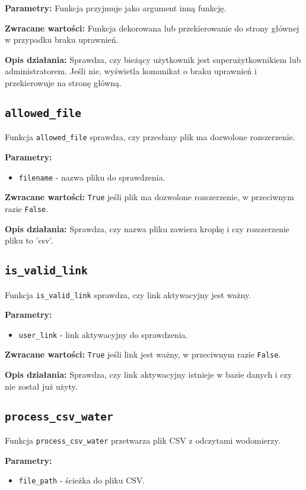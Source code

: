 \documentclass[12pt,a4paper]{report}
\begin{document}
\textbf{Parametry:} Funkcja przyjmuje jako argument inną funkcję.

\textbf{Zwracane wartości:} Funkcja dekorowana lub przekierowanie do strony głównej w przypadku braku uprawnień.

\textbf{Opis działania:}
Sprawdza, czy bieżący użytkownik jest superużytkownikiem lub administratorem. Jeśli nie, wyświetla komunikat o braku uprawnień i przekierowuje na stronę główną.

\subsection{\texttt{allowed\_file}}
Funkcja \texttt{allowed\_file} sprawdza, czy przesłany plik ma dozwolone rozszerzenie.

\textbf{Parametry:}
\begin{itemize}
    \item \texttt{filename} - nazwa pliku do sprawdzenia.
\end{itemize}

\textbf{Zwracane wartości:} \texttt{True} jeśli plik ma dozwolone rozszerzenie, w przeciwnym razie \texttt{False}.

\textbf{Opis działania:}
Sprawdza, czy nazwa pliku zawiera kropkę i czy rozszerzenie pliku to 'csv'.

\subsection{\texttt{is\_valid\_link}}
Funkcja \texttt{is\_valid\_link} sprawdza, czy link aktywacyjny jest ważny.

\textbf{Parametry:}
\begin{itemize}
    \item \texttt{user\_link} - link aktywacyjny do sprawdzenia.
\end{itemize}

\textbf{Zwracane wartości:} \texttt{True} jeśli link jest ważny, w przeciwnym razie \texttt{False}.

\textbf{Opis działania:}
Sprawdza, czy link aktywacyjny istnieje w bazie danych i czy nie został już użyty.

\subsection{\texttt{process\_csv\_water}}
Funkcja \texttt{process\_csv\_water} przetwarza plik CSV z odczytami wodomierzy.

\textbf{Parametry:}
\begin{itemize}
    \item \texttt{file\_path} - ścieżka do pliku CSV.
\end{itemize}
\end{document}
